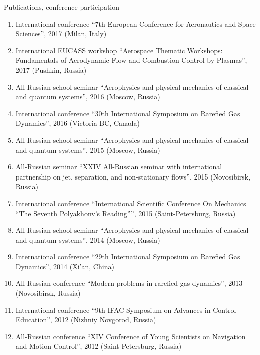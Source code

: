 \documentclass{resume} %
\begin{document}
\begin{rSection}{Publications, conference participation}
\begin{enumerate}
    \item International conference ``7th European Conference for Aeronautics and Space Sciences'', 2017 (Milan, Italy)
    \item International EUCASS workshop ``Aerospace Thematic Workshops: Fundamentals of Aerodynamic Flow and Combustion Control by Plasmas'', 2017 (Pushkin, Russia)
    \item All-Russian school-seminar ``Aerophysics and physical mechanics of classical and quantum systems'', 2016 (Moscow, Russia)
    \item International conference ``30th International Symposium on Rarefied Gas Dynamics'', 2016 (Victoria BC, Canada)
    \item All-Russian school-seminar ``Aerophysics and physical mechanics of classical and quantum systems'', 2015 (Moscow, Russia)
    \item All-Russian seminar ``XXIV All-Russian seminar with international partnership on jet, separation, and non-stationary flows'', 2015 (Novosibirsk, Russia)
    \item International conference ``International Scientific Conference On Mechanics ``The Seventh Polyakhonv's Reading'''', 2015 (Saint-Petersburg, Russia)
    \item All-Russian school-seminar ``Aerophysics and physical mechanics of classical and quantum systems'', 2014 (Moscow, Russia)
    \item International conference ``29th International Symposium on Rarefied Gas Dynamics'', 2014 (Xi'an, China)
    \item All-Russian conference ``Modern problems in rarefied gas dynamics'', 2013 (Novosibirsk, Russia)
    \item International conference ``9th IFAC Symposium on Advances in Control Education'', 2012 (Nizhniy Novgorod, Russia)
    \item All-Russian conference ``XIV Conference of Young Scientists on Navigation and Motion Control'', 2012 (Saint-Petersburg, Russia)
\end{enumerate}

\end{rSection}


\end{document}
